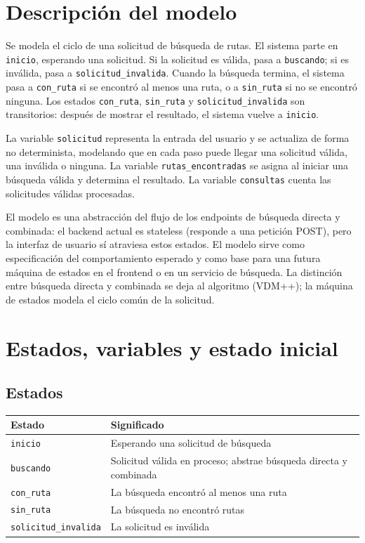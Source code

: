 \documentclass[11pt,a4paper]{article}
\begin{document}
\section{Descripción del modelo}

Se modela el ciclo de una solicitud de búsqueda de rutas. El sistema parte en \texttt{inicio}, esperando una solicitud. Si la solicitud es válida, pasa a \texttt{buscando}; si es inválida, pasa a \texttt{solicitud\_invalida}. Cuando la búsqueda termina, el sistema pasa a \texttt{con\_ruta} si se encontró al menos una ruta, o a \texttt{sin\_ruta} si no se encontró ninguna. Los estados \texttt{con\_ruta}, \texttt{sin\_ruta} y \texttt{solicitud\_invalida} son transitorios: después de mostrar el resultado, el sistema vuelve a \texttt{inicio}.

La variable \texttt{solicitud} representa la entrada del usuario y se actualiza de forma no determinista, modelando que en cada paso puede llegar una solicitud válida, una inválida o ninguna. La variable \texttt{rutas\_encontradas} se asigna al iniciar una búsqueda válida y determina el resultado. La variable \texttt{consultas} cuenta las solicitudes válidas procesadas.

El modelo es una abstracción del flujo de los endpoints de búsqueda directa y combinada: el backend actual es stateless (responde a una petición POST), pero la interfaz de usuario sí atraviesa estos estados. El modelo sirve como especificación del comportamiento esperado y como base para una futura máquina de estados en el frontend o en un servicio de búsqueda. La distinción entre búsqueda directa y combinada se deja al algoritmo (VDM++); la máquina de estados modela el ciclo común de la solicitud.

\section{Estados, variables y estado inicial}

\subsection{Estados}

\begin{center}
\begin{tabular}{|l|p{9cm}|}
\hline
\textbf{Estado} & \textbf{Significado} \\
\hline
\texttt{inicio} & Esperando una solicitud de búsqueda \\
\hline
\texttt{buscando} & Solicitud válida en proceso; abstrae búsqueda directa y combinada \\
\hline
\texttt{con\_ruta} & La búsqueda encontró al menos una ruta \\
\hline
\texttt{sin\_ruta} & La búsqueda no encontró rutas \\
\hline
\texttt{solicitud\_invalida} & La solicitud es inválida \\
\hline
\end{tabular}
\end{center}
\end{document}
